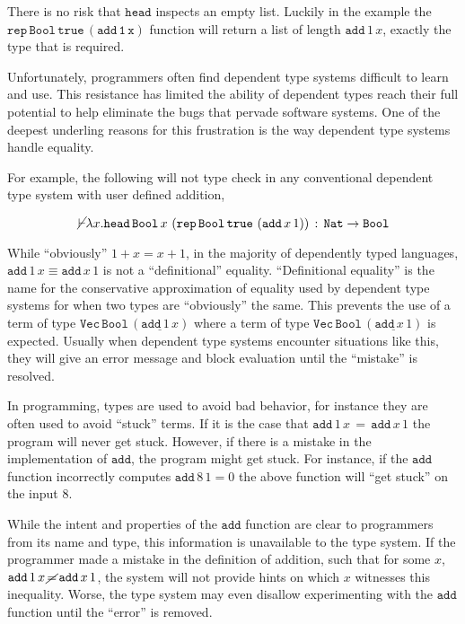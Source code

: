 There is no risk that $\mathtt{head}$ inspects an empty list. Luckily
in the example the $\mathtt{\mathtt{rep}\,\mathtt{Bool}\,\mathtt{true}\,\left(\mathtt{add}\,1\,x\right)}$
function will return a list of length $\mathtt{add}\,1\,x$, exactly
the type that is required.


Unfortunately, programmers often find dependent type systems difficult
to learn and use. This resistance has limited the ability of dependent
types reach their full potential to help eliminate the bugs that pervade
software systems. One of the deepest underling reasons for this frustration
is the way dependent type systems handle equality.

For example, the following will not type check in any conventional
dependent type system with user defined addition,

\[
\cancel{\vdash}\lambda x.\mathtt{head}\,\mathtt{Bool}\,x\,\left(\mathtt{rep}\,\mathtt{Bool}\,\mathtt{true}\,\left(\mathtt{add}\,x\,1\right)\right)\,:\,\mathtt{Nat}\rightarrow\mathtt{Bool}
\]

While ``obviously'' $1+x=x+1$, in the majority of dependently typed
languages, $\mathtt{add}\,1\,x\equiv\mathtt{add}\,x\,1$ is not a
``definitional'' equality. ``Definitional equality'' is the name
for the conservative approximation of equality used by dependent type
systems for when two types are ``obviously'' the same. This prevents
the use of a term of type $\mathtt{Vec}\,\mathtt{Bool}\,\left(\underline{\mathtt{add}\,1\,x}\right)$
where a term of type $\mathtt{Vec}\,\mathtt{Bool}\,\left(\underline{\mathtt{add}\,x\,1}\right)$
is expected. Usually when dependent type systems encounter situations
like this, they will give an error message and block evaluation until
the ``mistake'' is resolved.

In programming, types are used to avoid bad behavior, for instance
they are often used to avoid ``stuck'' terms. If it is the case
that $\mathtt{add}\,1\,x\,=\,\mathtt{add}\,x\,1$ the program will
never get stuck. However, if there is a mistake in the implementation
of $\mathtt{add}$, the program might get stuck. For instance, if
the $\mathtt{add}$ function incorrectly computes $\mathtt{add}\,8\,1=0$
the above function will ``get stuck'' on the input $8$. 

While the intent and properties of the $\mathtt{add}$ function are
clear to programmers from its name and type, this information is unavailable
to the type system. If the programmer made a mistake in the definition
of addition, such that for some $x$, $\mathtt{add}\,1\,x\,\cancel{=}\,\mathtt{add}\,x\,1$,
the system will not provide hints on which $x$ witnesses this inequality.
Worse, the type system may even disallow experimenting with the $\mathtt{add}$
function until the ``error'' is removed.

